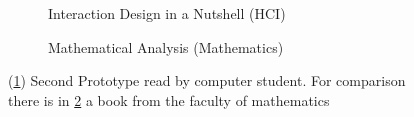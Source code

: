 \begin{figure}[h]
  \centering
  \begin{subfigure}{0.48\textwidth}
    \centering
    \todo
    \caption{Interaction Design in a Nutshell (HCI)}
    \label{fig:meta_prototype2_hci}
  \end{subfigure}
  \hspace{0.1em}
  \begin{subfigure}{0.48\textwidth}
    \centering
    \todo
    \caption{Mathematical Analysis (Mathematics)}
    \label{fig:meta_prototype2_math}
  \end{subfigure}
  \caption{(\ref{fig:meta_prototype2_hci}) Second Prototype read by computer student. For comparison there is in \ref{fig:meta_prototype2_math} a book from the faculty of mathematics}
  \label{fig:meta_prototype2}
\end{figure}
